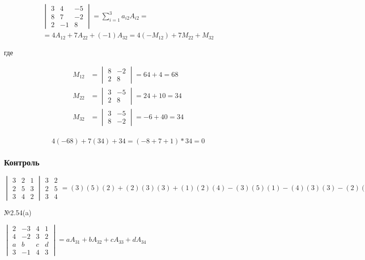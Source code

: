 \documentclass{article}
\begin{document}
\begin{gather*}
	\begin{vmatrix}
		3 & 4 & -5 \\
		8 & 7 & -2 \\
		2 & -1 & 8
	\end{vmatrix} = \sum_{i=1}^{3} a_{i2} A_{i2} = \\
	= 4A_{12} + 7A_{22} + (-1)A_{32} =
	4(-M_{12}) + 7M_{22} + M_{32}		
\end{gather*}

где

\begin{align*}
	M_{12} &= 
	\begin{vmatrix}
		8 & -2 \\
		2 & 8
	\end{vmatrix}
	= 64 + 4 = 68 \\
	M_{22} &=
	\begin{vmatrix}
		3 & -5 \\
		2 & 8
	\end{vmatrix}
	= 24 + 10 = 34 \\
	M_{32} &=
	\begin{vmatrix}
		3 & -5 \\
		8 & -2
	\end{vmatrix}
	= -6 + 40 = 34 \\
\end{align*}

\[
	4(-68) + 7(34) + 34 = (-8 + 7 + 1) * 34 = 0
\]

\subsubsection{Контроль}

$
\begin{vmatrix}
	3 & 2 & 1 \\
	2 & 5 & 3 \\
	3 & 4 & 2
\end{vmatrix}
\begin{matrix}
	3 & 2 \\
	2 & 5 \\
	3 & 4
\end{matrix}
= (3)(5)(2) + (2)(3)(3) + (1)(2)(4)
- (3)(5)(1) - (4)(3)(3) - (2)(2)(2) =
30 + 18 + 8 - 15 - 36 - 8 = -3
$

№2.54(a)

$
\begin{vmatrix}
	2 & -3 & 4 & 1 \\
	4 & -2 & 3 & 2 \\
	a & b & c & d \\
	3 & -1 & 4 & 3
\end{vmatrix}
= a A_{31} + b A_{32} + c A_{33} + d A_{34}
$
\end{document}

